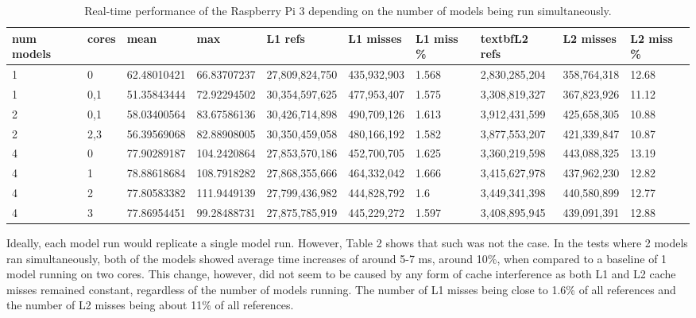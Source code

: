 \documentclass[10pt, conference]{IEEEtran}
\begin{document}
\begin{table}[t]
  \begin{tabular} {| l | l | l | l | l | l | l | l | l | l |}
  \hline
  \textbf{num models} & \textbf{cores} & \textbf{mean} & \textbf{max} & \textbf{L1 refs} & \textbf{L1 
    misses} & \textbf{L1 miss \%} & textbf{L2 refs} & \textbf{L2 misses} & \textbf{L2 miss \%} \\ \hline
  1 & 0 &  62.48010421 & 66.83707237 & 27,809,824,750 & 435,932,903	& 1.568 & 2,830,285,204	& 
    358,764,318 & 12.68 \\ \hline
  1 & 0,1 & 51.35843444 & 72.92294502 & 30,354,597,625 &  477,953,407 & 1.575 & 3,308,819,327 & 
    367,823,926 & 11.12 \\ \hline
  2 & 0,1 & 58.03400564 & 83.67586136 & 30,426,714,898 & 490,709,126 & 1.613 & 3,912,431,599 & 
    425,658,305 & 10.88 \\ \hline
  2 & 2,3 & 56.39569068 & 82.88908005 & 30,350,459,058 & 480,166,192 & 1.582 & 3,877,553,207 & 
    421,339,847 & 10.87 \\ \hline
  4 & 0 & 77.90289187 & 104.2420864 & 27,853,570,186 & 452,700,705 & 1.625 & 3,360,219,598 & 
    443,088,325 & 13.19 \\ \hline
  4 & 1 & 78.88618684 & 108.7918282 & 27,868,355,666 & 464,332,042 & 1.666 & 3,415,627,978 & 
    437,962,230 & 12.82 \\ \hline
  4 & 2 & 77.80583382 & 111.9449139 & 27,799,436,982 & 444,828,792 & 1.6 & 3,449,341,398 & 440,580,899 
    & 12.77 \\ \hline
  4 & 3 & 77.86954451 & 99.28488731 & 27,875,785,919 & 445,229,272 & 1.597 & 3,408,895,945 & 
    439,091,391 & 12.88 \\
  \hline
  \end{tabular}
  \caption{Real-time performance of the Raspberry Pi 3 depending on the number of models being run 
    simultaneously.}
\end{table}

Ideally, each model run would replicate a single model run. However, Table 2 shows that such was not 
the case. In the tests where 2 models ran simultaneously, both of the models showed average time 
increases of around 5-7 ms, around 10\%, when compared to a baseline of 1 model running on two cores. 
This change, however, did not seem to be caused by any form of cache interference as both L1 and L2 
cache misses remained constant, regardless of the number of models running. The number of L1 misses 
being close to 1.6\% of all references and the number of L2 misses being about 11\% of all 
references.
\end{document}
